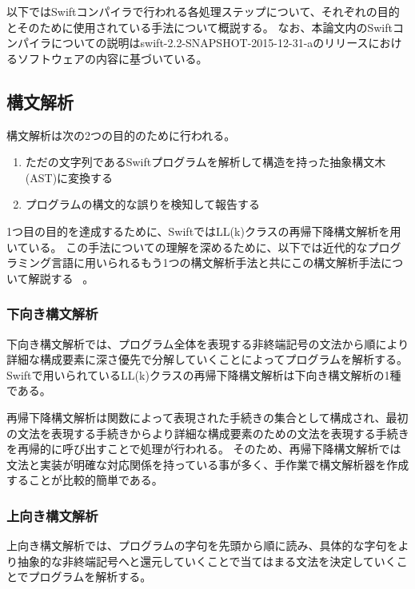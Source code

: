 以下ではSwiftコンパイラで行われる各処理ステップについて、それぞれの目的とそのために使用されている手法について概説する。
なお、本論文内のSwiftコンパイラについての説明はswift-2.2-SNAPSHOT-2015-12-31-aのリリースにおけるソフトウェアの内容に基づいている。

\subsection{構文解析}

構文解析は次の2つの目的のために行われる。

\begin{enumerate}
    \item ただの文字列であるSwiftプログラムを解析して構造を持った抽象構文木(AST)に変換する
    \item プログラムの構文的な誤りを検知して報告する
\end{enumerate}

1つ目の目的を達成するために、SwiftではLL(k)クラスの再帰下降構文解析を用いている。
この手法についての理解を深めるために、以下では近代的なプログラミング言語に用いられるもう1つの構文解析手法と共にこの構文解析手法について解説する ~\cite{dragonbook}。

\subsubsection{下向き構文解析}

下向き構文解析では、プログラム全体を表現する非終端記号の文法から順により詳細な構成要素に深さ優先で分解していくことによってプログラムを解析する。
Swiftで用いられているLL(k)クラスの再帰下降構文解析は下向き構文解析の1種である。


再帰下降構文解析は関数によって表現された手続きの集合として構成され、最初の文法を表現する手続きからより詳細な構成要素のための文法を表現する手続きを再帰的に呼び出すことで処理が行われる。
そのため、再帰下降構文解析では文法と実装が明確な対応関係を持っている事が多く、手作業で構文解析器を作成することが比較的簡単である。

\subsubsection{上向き構文解析}

上向き構文解析では、プログラムの字句を先頭から順に読み、具体的な字句をより抽象的な非終端記号へと還元していくことで当てはまる文法を決定していくことでプログラムを解析する。

